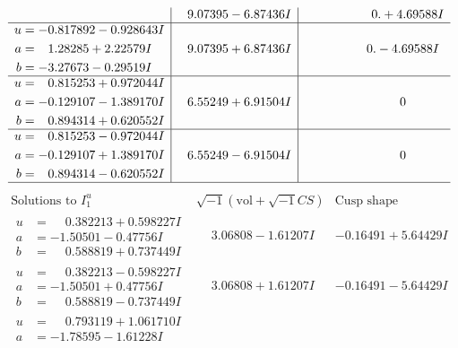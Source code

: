 \documentclass[1p]{elsarticle_modified}
\theoremstyle{definition}
\newcommand{\I}{\sqrt{-1}}
\begin{document}
$$\begin{array}{c|c|c}
 & \phantom{-}9.07395 - 6.87436 I & \phantom{-0.000000 -}0. + 4.69588 I \\ \hline\begin{aligned}
u &= -0.817892 - 0.928643 I \\
a &= \phantom{-}1.28285 + 2.22579 I \\
b &= -3.27673 - 0.29519 I\end{aligned}
 & \phantom{-}9.07395 + 6.87436 I & \phantom{-0.000000 } 0. - 4.69588 I \\ \hline\begin{aligned}
u &= \phantom{-}0.815253 + 0.972044 I \\
a &= -0.129107 - 1.389170 I \\
b &= \phantom{-}0.894314 + 0.620552 I\end{aligned}
 & \phantom{-}6.55249 + 6.91504 I & \phantom{-0.000000 } 0 \\ \hline\begin{aligned}
u &= \phantom{-}0.815253 - 0.972044 I \\
a &= -0.129107 + 1.389170 I \\
b &= \phantom{-}0.894314 - 0.620552 I\end{aligned}
 & \phantom{-}6.55249 - 6.91504 I & \phantom{-0.000000 } 0\\
 \hline 
 \end{array}$$\newpage$$\begin{array}{c|c|c}  
\text{Solutions to }I^u_{1}& \I (\text{vol} + \sqrt{-1}CS) & \text{Cusp shape}\\
 \hline 
\begin{aligned}
u &= \phantom{-}0.382213 + 0.598227 I \\
a &= -1.50501 - 0.47756 I \\
b &= \phantom{-}0.588819 + 0.737449 I\end{aligned}
 & \phantom{-}3.06808 - 1.61207 I & -0.16491 + 5.64429 I \\ \hline\begin{aligned}
u &= \phantom{-}0.382213 - 0.598227 I \\
a &= -1.50501 + 0.47756 I \\
b &= \phantom{-}0.588819 - 0.737449 I\end{aligned}
 & \phantom{-}3.06808 + 1.61207 I & -0.16491 - 5.64429 I \\ \hline\begin{aligned}
u &= \phantom{-}0.793119 + 1.061710 I \\
a &= -1.78595 - 1.61228 I \\

\end{aligned}
\end{array}$$
\end{document}
